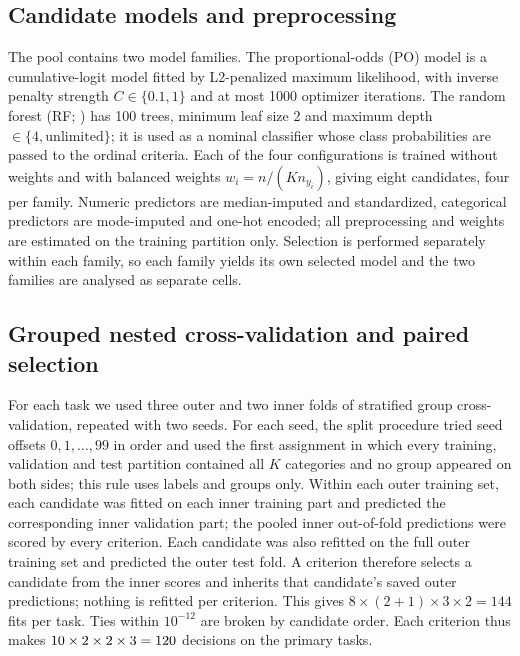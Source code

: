 \documentclass[pdflatex,sn-mathphys-ay]{sn-jnl}
\theoremstyle{thmstyleone}
\theoremstyle{thmstylethree}
\begin{document}
\subsection{Candidate models and preprocessing}

The pool contains two model families. The proportional-odds (PO) model \citep{McCullagh1980} is a cumulative-logit model fitted by L2-penalized maximum likelihood, with inverse penalty strength $C\in\{0.1,1\}$ and at most 1000 optimizer iterations. The random forest (RF; \citealp{Breiman2001}) has 100 trees, minimum leaf size 2 and maximum depth $\in\{4,\text{unlimited}\}$; it is used as a nominal classifier whose class probabilities are passed to the ordinal criteria. Each of the four configurations is trained without weights and with balanced weights $w_i=n/(K n_{y_i})$, giving eight candidates, four per family. Numeric predictors are median-imputed and standardized, categorical predictors are mode-imputed and one-hot encoded; all preprocessing and weights are estimated on the training partition only. Selection is performed separately within each family, so each family yields its own selected model and the two families are analysed as separate cells.

\subsection{Grouped nested cross-validation and paired selection}

For each task we used three outer and two inner folds of stratified group cross-validation, repeated with two seeds. For each seed, the split procedure tried seed offsets $0,1,\dots,99$ in order and used the first assignment in which every training, validation and test partition contained all $K$ categories and no group appeared on both sides; this rule uses labels and groups only. Within each outer training set, each candidate was fitted on each inner training part and predicted the corresponding inner validation part; the pooled inner out-of-fold predictions were scored by every criterion. Each candidate was also refitted on the full outer training set and predicted the outer test fold. A criterion therefore selects a candidate from the inner scores and inherits that candidate's saved outer predictions; nothing is refitted per criterion. This gives $8\times(2+1)\times 3\times 2=144$ fits per task. Ties within $10^{-12}$ are broken by candidate order. Each criterion thus makes $10\times2\times2\times3=120{}$ decisions on the primary tasks.
\end{document}
